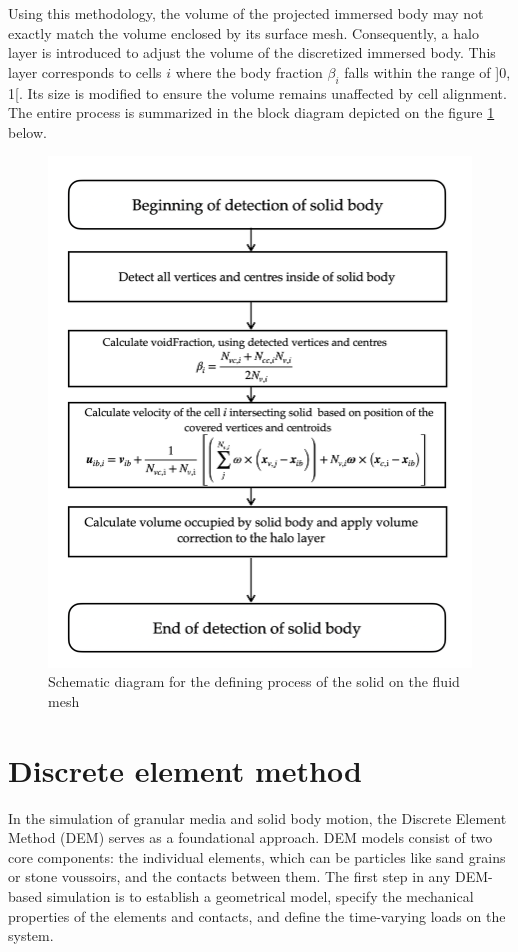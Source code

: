 Using this methodology, the volume of the projected immersed body may not exactly match the volume enclosed by its surface mesh. Consequently, a halo layer is introduced to adjust the volume of the discretized immersed body. This layer corresponds to cells $i$ where the body fraction $\beta_i$ falls within the range of ]0, 1[. Its size is modified to ensure the volume remains unaffected by cell alignment. The entire process is summarized in the block diagram depicted on the figure \ref{fig:diag} below.
\begin{figure}[!htp]
    \centering
    \includegraphics[width=12cm]{Images/chap3/diag.png}
    \caption{Schematic diagram for the defining process of the solid on the fluid mesh}
    \label{fig:diag}
\end{figure}
\section{Discrete element method}
In the simulation of granular media and solid body motion, the Discrete Element Method (DEM) serves as a foundational approach. DEM models consist of two core components: the individual elements, which can be particles like sand grains or stone voussoirs, and the contacts between them. The first step in any DEM-based simulation is to establish a geometrical model, specify the mechanical properties of the elements and contacts, and define the time-varying loads on the system.

